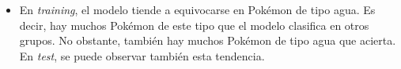 \documentclass[
  12pt,
]{extreport}
\newenvironment{Shaded}{\begin{snugshade}}{\end{snugshade}}
\newcommand{\FunctionTok}[1]{\textcolor[rgb]{0.28,0.35,0.67}{#1}}
\newcommand{\NormalTok}[1]{\textcolor[rgb]{0.00,0.23,0.31}{#1}}
\newcommand{\SpecialCharTok}[1]{\textcolor[rgb]{0.37,0.37,0.37}{#1}}
\newcommand{\StringTok}[1]{\textcolor[rgb]{0.13,0.47,0.30}{#1}}
\begin{document}
\begin{itemize}
\item
  En \emph{training}, el modelo tiende a equivocarse en Pokémon de tipo
  agua. Es decir, hay muchos Pokémon de este tipo que el modelo
  clasifica en otros grupos. No obstante, también hay muchos Pokémon de
  tipo agua que acierta. En \emph{test}, se puede observar también esta
  tendencia.

\begin{Shaded}
\end{Shaded}


\end{itemize}
\end{document}
